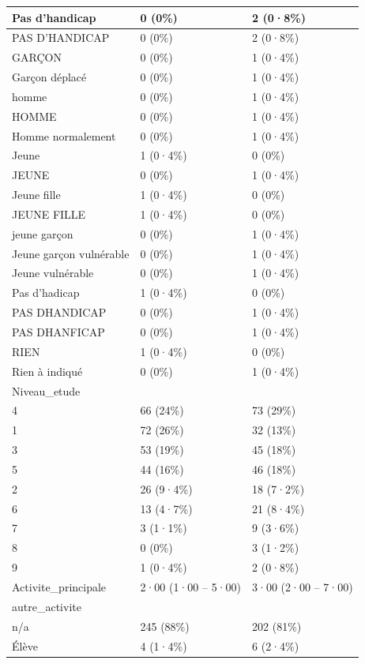 \documentclass[
]{book}
\begin{document}
\begin{tabular}{l|l|l}
\hline
Pas d'handicap & 0 (0\%) & 2 (0·8\%)\\
\hline
PAS D'HANDICAP & 0 (0\%) & 2 (0·8\%)\\
\hline
GARÇON & 0 (0\%) & 1 (0·4\%)\\
\hline
Garçon déplacé & 0 (0\%) & 1 (0·4\%)\\
\hline
homme & 0 (0\%) & 1 (0·4\%)\\
\hline
HOMME & 0 (0\%) & 1 (0·4\%)\\
\hline
Homme normalement & 0 (0\%) & 1 (0·4\%)\\
\hline
Jeune & 1 (0·4\%) & 0 (0\%)\\
\hline
JEUNE & 0 (0\%) & 1 (0·4\%)\\
\hline
Jeune fille & 1 (0·4\%) & 0 (0\%)\\
\hline
JEUNE FILLE & 1 (0·4\%) & 0 (0\%)\\
\hline
jeune garçon & 0 (0\%) & 1 (0·4\%)\\
\hline
Jeune garçon vulnérable & 0 (0\%) & 1 (0·4\%)\\
\hline
Jeune vulnérable & 0 (0\%) & 1 (0·4\%)\\
\hline
Pas d'hadicap & 1 (0·4\%) & 0 (0\%)\\
\hline
PAS DHANDICAP & 0 (0\%) & 1 (0·4\%)\\
\hline
PAS DHANFICAP & 0 (0\%) & 1 (0·4\%)\\
\hline
RIEN & 1 (0·4\%) & 0 (0\%)\\
\hline
Rien à indiqué & 0 (0\%) & 1 (0·4\%)\\
\hline
Niveau\_etude &  & \\
\hline
4 & 66 (24\%) & 73 (29\%)\\
\hline
1 & 72 (26\%) & 32 (13\%)\\
\hline
3 & 53 (19\%) & 45 (18\%)\\
\hline
5 & 44 (16\%) & 46 (18\%)\\
\hline
2 & 26 (9·4\%) & 18 (7·2\%)\\
\hline
6 & 13 (4·7\%) & 21 (8·4\%)\\
\hline
7 & 3 (1·1\%) & 9 (3·6\%)\\
\hline
8 & 0 (0\%) & 3 (1·2\%)\\
\hline
9 & 1 (0·4\%) & 2 (0·8\%)\\
\hline
Activite\_principale & 2·00 (1·00 – 5·00) & 3·00 (2·00 – 7·00)\\
\hline
autre\_activite &  & \\
\hline
n/a & 245 (88\%) & 202 (81\%)\\
\hline
Élève & 4 (1·4\%) & 6 (2·4\%)\\

\end{tabular}
\end{document}
